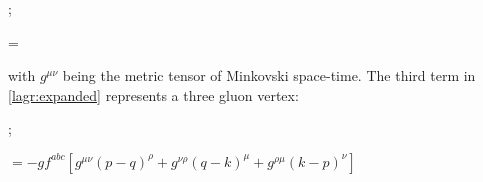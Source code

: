 \begin{minipage}{0.4\textwidth}
\begin{center}
    ;     
\end{center}
\end{minipage}
\begin{minipage}{0.58\textwidth}
        \beq \nonumber =  ~~~~~~~~~~~~~~~~~~~~~~~~~~~~~\eeq
\end{minipage} 
with $g^{\mu\nu}$ being the metric tensor of Minkovski space-time. The third term in \cref{lagr:expanded} represents a three gluon vertex:
\begin{center}
\begin{minipage}{0.4\textwidth}
    \hspace{2cm};
\end{minipage}
\begin{minipage}{0.58\textwidth}
    $ = -gf^{abc}\left[g^{\mu\nu}(p-q)^\rho + g^{\nu\rho}(q-k)^\mu + g^{\rho\mu}(k-p)^\nu \right] $
\end{minipage}
\end{center}

